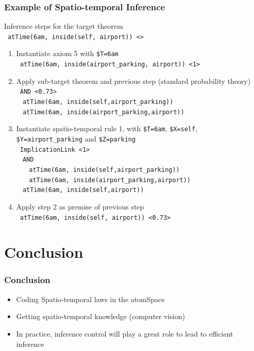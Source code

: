 \documentclass{beamer}
\begin{document}
\frame
{
  \frametitle{Example of Spatio-temporal Inference}

  \begin{beamerboxesrounded}{Inference steps for the \alert{target theorem}\\
    {\scriptsize
    {\tt
    atTime(6am, inside(self, airport))
    <>
    }
    }
  }
  {\tiny
  \begin{enumerate}
  \item<+-> Instantiate axiom 5 with {\tt \$T=6am}\\
    {\tt
    atTime(6am, inside(airport\_parking, airport)) <1>
    }
  \item<+-> Apply sub-target theorem and previous step (standard probability
    theory)\\
    {\tt
    AND <0.73>\\
    $\ \ \ \ $atTime(6am, inside(self,airport\_parking))\\
    $\ \ \ \ $atTime(6am, inside(airport\_parking,airport))\\
    }
  \item<+-> Instantiate spatio-temporal rule 1, with {\tt \$T=6am},
    {\tt \$X=self}, {\tt \$Y=airport\_parking} and
    {\tt \$Z=parking}\\
    {\tt
    ImplicationLink <1>\\
    $\ \ \ \ $AND\\
    $\ \ \ \ \ \ \ \ $atTime(6am, inside(self,airport\_parking))\\
    $\ \ \ \ \ \ \ \ $atTime(6am, inside(airport\_parking,airport))\\
    $\ \ \ \ $atTime(6am, inside(self,airport))\\
    }
  \item<+-> Apply step 2 as premise of previous step\\
    {\tt
      \alert<5>{atTime(6am, inside(self, airport)) <0.73>}
    }
  \end{enumerate}
  }
  \end{beamerboxesrounded}
}



\section{Conclusion}

\frame
{
  \frametitle{Conclusion}
  \begin{itemize}
  \item Coding Spatio-temporal laws in the atomSpace
  \item Getting spatio-temporal knowledge (computer vision)
  \item In practice, \alert{inference control} will play
    a great role to lead to efficient inference
  \end{itemize}
}
\end{document}
